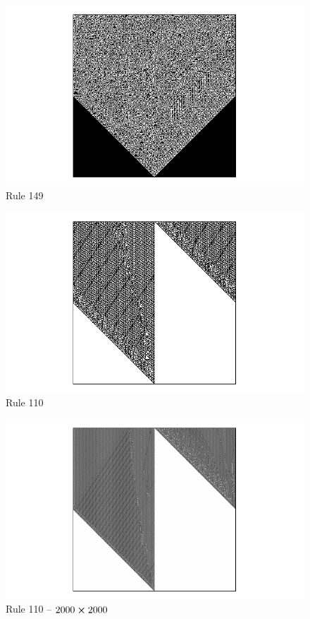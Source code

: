 \begin{figure}
 \centering
 \includegraphics[trim = 40mm 0mm 0mm 0mm, width=1.7\textwidth]{./img/149_500}
 \caption{Rule 149}
 \label{koberec}
\end{figure}

\begin{figure}
 \centering
 \includegraphics[trim = 40mm 0mm 0mm 0mm, width=1.7\textwidth]{./img/110_500}
 \caption{Rule 110}
\end{figure}

\begin{figure}
 \centering
 \includegraphics[trim = 40mm 0mm 0mm 0mm, width=1.7\textwidth]{./img/110_2000}
 \caption{Rule 110 -- $2000 \cross 2000$}
\end{figure}


